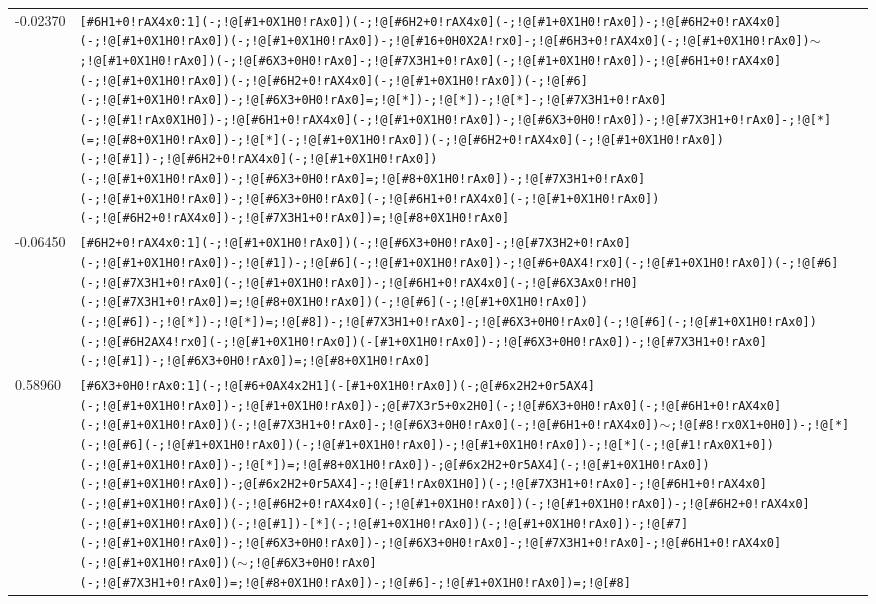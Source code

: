 \begin{longtable}{>{\baselineskip=10pt}p{} >{\baselineskip=10pt}p{}}
-0.02370 & \texttt{[\#6H1+0!rAX4x0:1](-;!@[\#1+0X1H0!rAx0])(-;!@[\#6H2+0!rAX4x0](-;!@[\#1+0X1H0!rAx0])-;!@[\#6H2+0!rAX4x0](-;!@[\#1+0X1H0!rAx0])(-;!@[\#1+0X1H0!rAx0])-;!@[\#16+0H0X2A!rx0]-;!@[\#6H3+0!rAX4x0](-;!@[\#1+0X1H0!rAx0])$\sim$;!@[\#1+0X1H0!rAx0])(-;!@[\#6X3+0H0!rAx0]-;!@[\#7X3H1+0!rAx0](-;!@[\#1+0X1H0!rAx0])-;!@[\#6H1+0!rAX4x0](-;!@[\#1+0X1H0!rAx0])(-;!@[\#6H2+0!rAX4x0](-;!@[\#1+0X1H0!rAx0])(-;!@[\#6](-;!@[\#1+0X1H0!rAx0])-;!@[\#6X3+0H0!rAx0]=;!@[*])-;!@[*])-;!@[*]-;!@[\#7X3H1+0!rAx0](-;!@[\#1!rAx0X1H0])-;!@[\#6H1+0!rAX4x0](-;!@[\#1+0X1H0!rAx0])-;!@[\#6X3+0H0!rAx0])-;!@[\#7X3H1+0!rAx0]-;!@[*](=;!@[\#8+0X1H0!rAx0])-;!@[*](-;!@[\#1+0X1H0!rAx0])(-;!@[\#6H2+0!rAX4x0](-;!@[\#1+0X1H0!rAx0])(-;!@[\#1])-;!@[\#6H2+0!rAX4x0](-;!@[\#1+0X1H0!rAx0])(-;!@[\#1+0X1H0!rAx0])-;!@[\#6X3+0H0!rAx0]=;!@[\#8+0X1H0!rAx0])-;!@[\#7X3H1+0!rAx0](-;!@[\#1+0X1H0!rAx0])-;!@[\#6X3+0H0!rAx0](-;!@[\#6H1+0!rAX4x0](-;!@[\#1+0X1H0!rAx0])(-;!@[\#6H2+0!rAX4x0])-;!@[\#7X3H1+0!rAx0])=;!@[\#8+0X1H0!rAx0]} \\ 
-0.06450 & \texttt{[\#6H2+0!rAX4x0:1](-;!@[\#1+0X1H0!rAx0])(-;!@[\#6X3+0H0!rAx0]-;!@[\#7X3H2+0!rAx0](-;!@[\#1+0X1H0!rAx0])-;!@[\#1])-;!@[\#6](-;!@[\#1+0X1H0!rAx0])-;!@[\#6+0AX4!rx0](-;!@[\#1+0X1H0!rAx0])(-;!@[\#6](-;!@[\#7X3H1+0!rAx0](-;!@[\#1+0X1H0!rAx0])-;!@[\#6H1+0!rAX4x0](-;!@[\#6X3Ax0!rH0](-;!@[\#7X3H1+0!rAx0])=;!@[\#8+0X1H0!rAx0])(-;!@[\#6](-;!@[\#1+0X1H0!rAx0])(-;!@[\#6])-;!@[*])-;!@[*])=;!@[\#8])-;!@[\#7X3H1+0!rAx0]-;!@[\#6X3+0H0!rAx0](-;!@[\#6](-;!@[\#1+0X1H0!rAx0])(-;!@[\#6H2AX4!rx0](-;!@[\#1+0X1H0!rAx0])(-[\#1+0X1H0!rAx0])-;!@[\#6X3+0H0!rAx0])-;!@[\#7X3H1+0!rAx0](-;!@[\#1])-;!@[\#6X3+0H0!rAx0])=;!@[\#8+0X1H0!rAx0]} \\ 
0.58960 & \texttt{[\#6X3+0H0!rAx0:1](-;!@[\#6+0AX4x2H1](-[\#1+0X1H0!rAx0])(-;@[\#6x2H2+0r5AX4](-;!@[\#1+0X1H0!rAx0])-;!@[\#1+0X1H0!rAx0])-;@[\#7X3r5+0x2H0](-;!@[\#6X3+0H0!rAx0](-;!@[\#6H1+0!rAX4x0](-;!@[\#1+0X1H0!rAx0])(-;!@[\#7X3H1+0!rAx0]-;!@[\#6X3+0H0!rAx0](-;!@[\#6H1+0!rAX4x0])$\sim$;!@[\#8!rx0X1+0H0])-;!@[*](-;!@[\#6](-;!@[\#1+0X1H0!rAx0])(-;!@[\#1+0X1H0!rAx0])-;!@[\#1+0X1H0!rAx0])-;!@[*](-;!@[\#1!rAx0X1+0])(-;!@[\#1+0X1H0!rAx0])-;!@[*])=;!@[\#8+0X1H0!rAx0])-;@[\#6x2H2+0r5AX4](-;!@[\#1+0X1H0!rAx0])(-;!@[\#1+0X1H0!rAx0])-;@[\#6x2H2+0r5AX4]-;!@[\#1!rAx0X1H0])(-;!@[\#7X3H1+0!rAx0]-;!@[\#6H1+0!rAX4x0](-;!@[\#1+0X1H0!rAx0])(-;!@[\#6H2+0!rAX4x0](-;!@[\#1+0X1H0!rAx0])(-;!@[\#1+0X1H0!rAx0])-;!@[\#6H2+0!rAX4x0](-;!@[\#1+0X1H0!rAx0])(-;!@[\#1])-[*](-;!@[\#1+0X1H0!rAx0])(-;!@[\#1+0X1H0!rAx0])-;!@[\#7](-;!@[\#1+0X1H0!rAx0])-;!@[\#6X3+0H0!rAx0])-;!@[\#6X3+0H0!rAx0]-;!@[\#7X3H1+0!rAx0]-;!@[\#6H1+0!rAX4x0](-;!@[\#1+0X1H0!rAx0])($\sim$;!@[\#6X3+0H0!rAx0](-;!@[\#7X3H1+0!rAx0])=;!@[\#8+0X1H0!rAx0])-;!@[\#6]-;!@[\#1+0X1H0!rAx0])=;!@[\#8]} \\ 

\end{longtable}
